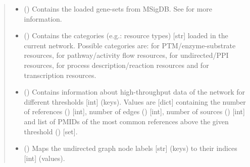 \documentclass[letterpaper,10pt,english]{sphinxmanual}
\begin{document}
\begin{fulllineitems}
\begin{quote}
\begin{description}
\begin{itemize}
\item {} 
 () \textendash{} Contains the loaded gene-sets from MSigDB. See
 for more information.

\item {} 
 () \textendash{} Contains the categories (e.g.: resource types) {[}str{]} loaded in
the current network. Possible categories are:  for
PTM/enzyme-substrate resources,  for pathway/activity
flow resources,  for undirected/PPI resources, 
for process description/reaction resources and  for
transcription resources.

\item {} 
 () \textendash{} Contains information about high-throughput data of the network
for different thresholds {[}int{]} (keys). Values are {[}dict{]}
containing the number of references () {[}int{]}, number
of edges () {[}int{]}, number of sources ()
{[}int{]} and list of PMIDs of the most common references above the
given threshold () {[}set{]}.

\item {} 
 () \textendash{} Maps the undirected graph node labels {[}str{]} (keys) to their
indices {[}int{]} (values).


\end{itemize}
\end{description}
\end{quote}
\end{fulllineitems}
\end{document}
